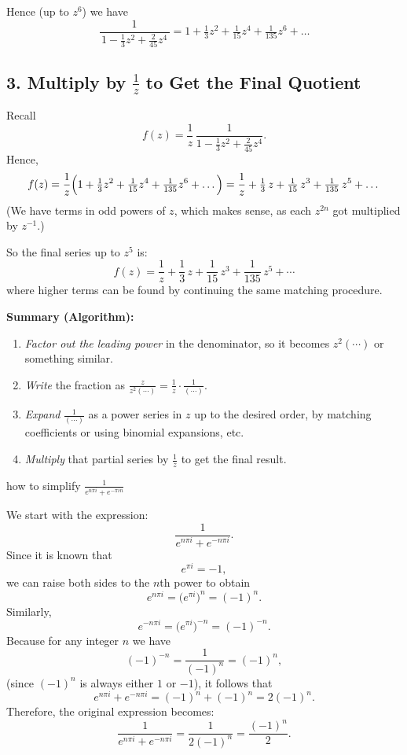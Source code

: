 \documentclass[12pt]{article}
\theoremstyle{definition} %
\theoremstyle{plain} %
\begin{document}
Hence (up to $z^6$) we have
\[
\frac{1}{\,1 - \tfrac{1}{3}z^2 + \tfrac{2}{45}z^4\,}
= 1 + \tfrac{1}{3}z^2 + \tfrac{1}{15}z^4 + \tfrac{1}{135}z^6 + \dots
\]

\subsection*{3. Multiply by \(\tfrac{1}{z}\) to Get the Final Quotient}

Recall
\[
f(z) = \frac{1}{z}\,\frac{1}{1 - \tfrac{1}{3}z^2 + \tfrac{2}{45}z^4}.
\]
Hence,
\[
f(z)
= \frac{1}{z}\Bigl(1 + \tfrac{1}{3}z^2 + \tfrac{1}{15}z^4 + \tfrac{1}{135}z^6 + \dots\Bigr)
= \frac{1}{z}
+ \tfrac{1}{3}\,z
+ \tfrac{1}{15}\,z^3
+ \tfrac{1}{135}\,z^5
+ \dots
\]
(We have terms in odd powers of $z$, which makes sense, as each $z^{2n}$ got multiplied by $z^{-1}$.)

\medskip

So the final series up to $z^5$ is:
\[
\boxed{
f(z) = \frac{1}{z} + \frac{1}{3}\,z + \frac{1}{15}\,z^3 + \frac{1}{135}\,z^5 + \cdots
}
\]
where higher terms can be found by continuing the same matching procedure.

\bigskip

\textbf{Summary (Algorithm):}
\begin{enumerate}
  \item \emph{Factor out the leading power} in the denominator, so it becomes $z^2(\cdots)$ or something similar.
  \item \emph{Write} the fraction as $\tfrac{z}{z^2(\cdots)}=\tfrac{1}{z}\cdot\tfrac{1}{(\cdots)}$.
  \item \emph{Expand} $\frac{1}{(\cdots)}$ as a power series in $z$ up to the desired order, by matching coefficients or using binomial expansions, etc.
  \item \emph{Multiply} that partial series by $\frac{1}{z}$ to get the final result.
\end{enumerate}
how to simplify $\frac{1}{e^{n\pi i}+ e^{-\pi i n}}$ 


We start with the expression:
\[
\frac{1}{e^{n\pi i} + e^{-n\pi i}}.
\]
Since it is known that
\[
e^{\pi i} = -1,
\]
we can raise both sides to the \(n\)th power to obtain
\[
e^{n\pi i} = \bigl(e^{\pi i}\bigr)^n = (-1)^n.
\]
Similarly,
\[
e^{-n\pi i} = \bigl(e^{\pi i}\bigr)^{-n} = (-1)^{-n}.
\]
Because for any integer \(n\) we have
\[
(-1)^{-n} = \frac{1}{(-1)^n} = (-1)^n,
\]
(since \((-1)^n\) is always either \(1\) or \(-1\)), it follows that
\[
e^{n\pi i} + e^{-n\pi i} = (-1)^n + (-1)^n = 2(-1)^n.
\]
Therefore, the original expression becomes:
\[
\frac{1}{e^{n\pi i} + e^{-n\pi i}} = \frac{1}{2(-1)^n} = \frac{(-1)^n}{2}.
\]
\end{document}

